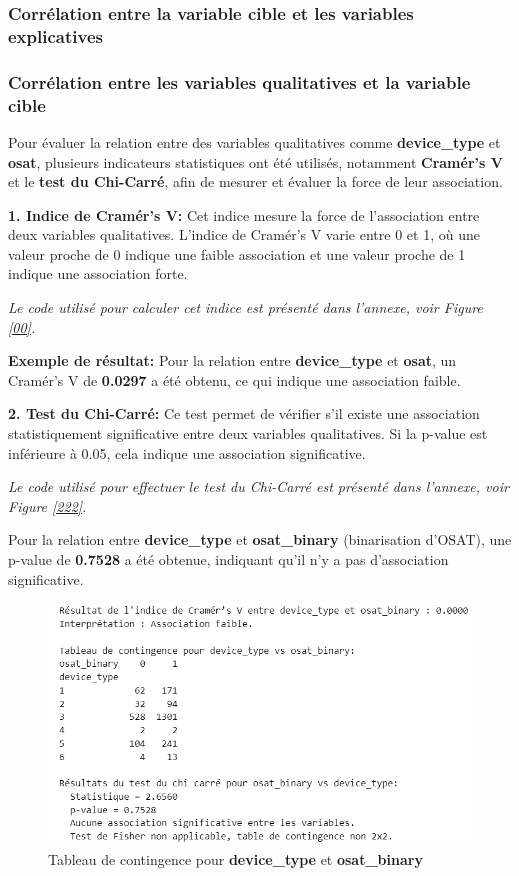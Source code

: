 \subsubsection{Corrélation entre la variable cible et les variables explicatives}
\subsubsection*{Corrélation entre les variables qualitatives et la variable cible}

Pour évaluer la relation entre des variables qualitatives comme \textbf{device\_type} et \textbf{osat}, plusieurs indicateurs statistiques ont été utilisés, notamment \textbf{Cramér's V} et le \textbf{test du Chi-Carré}, afin de mesurer et évaluer la force de leur association.

\textbf{1. Indice de Cramér’s V:} Cet indice mesure la force de l'association entre deux variables qualitatives. L'indice de Cramér’s V varie entre 0 et 1, où une valeur proche de 0 indique une faible association et une valeur proche de 1 indique une association forte.

\textit{Le code utilisé pour calculer cet indice est présenté dans l'annexe, voir Figure \ref{00}.}

\textbf{\checkmark Exemple de résultat:} Pour la relation entre \textbf{device\_type} et \textbf{osat}, un Cramér's V de \textbf{0.0297} a été obtenu, ce qui indique une association faible.

    
\textbf{2. Test du Chi-Carré:} Ce test permet de vérifier s'il existe une association statistiquement significative entre deux variables qualitatives. Si la p-value est inférieure à 0.05, cela indique une association significative.

\textit{Le code utilisé pour effectuer le test du Chi-Carré est présenté dans l'annexe, voir Figure \ref{222}.}

Pour la relation entre \textbf{device\_type} et \textbf{osat\_binary} (binarisation d'OSAT), une p-value de \textbf{0.7528} a été obtenue, indiquant qu'il n'y a pas d'association significative.



\begin{figure}[H]
    \centering
    \includegraphics[width=0.6\linewidth]{capture_sas_39.png}
    \caption{Tableau de contingence pour \textbf{device\_type} et \textbf{osat\_binary}}
\end{figure}

